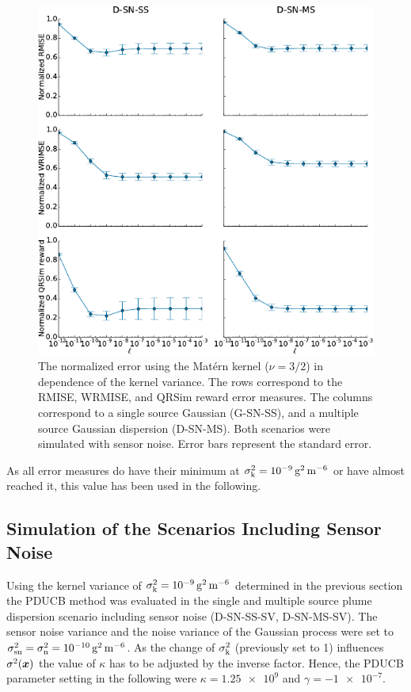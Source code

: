 \begin{figure}
    \centering
    \includegraphics{plots/kvar}
    \caption[Normalized error in dependence of the kernel process variance]{The 
        normalized error using the Mat\'ern kernel ($\nu = 3/2$) in dependence 
        of the kernel variance.  The rows correspond to the RMISE, WRMISE, and 
        QRSim reward error measures.  The columns correspond to a single source 
        Gaussian (G-SN-SS), and a multiple source Gaussian dispersion (D-SN-MS).  
        Both scenarios were simulated with sensor noise.  Error bars represent 
        the standard error.}\label{fig:kvar}
\end{figure}

As all error measures do have their minimum at $\sigma\ped{k}^2 
= \SI{1e-9}{\gram\squared\per\meter\tothe{6}}$ or have almost reached it, this 
value has been used in the following.

\subsection{Simulation of the Scenarios Including Sensor Noise}
Using the kernel variance of $\sigma\ped{k}^2 
= \SI{1e-9}{\gram\squared\per\meter\tothe{6}}$ determined in the previous 
section the PDUCB method was evaluated in the single and multiple source plume 
dispersion scenario including sensor noise (D-SN-SS-SV, D-SN-MS-SV). The sensor 
noise variance and the noise variance of the Gaussian process were set to 
$\sigma\ped{sn}^2 = \sigma\ped{n}^2 
= \SI{1e-10}{\gram\squared\per\meter\tothe{6}}$.  As the change of 
$\sigma_{\mathrm{k}}^2$ (previously set to 1) influences $\sigma^2(\bm{x})$ the value 
of $\kappa$ has to be adjusted by the inverse factor. Hence, the PDUCB parameter 
setting in the following were $\kappa = \num{1.25e9}$ and $\gamma 
= \num{-1e-7}$.


